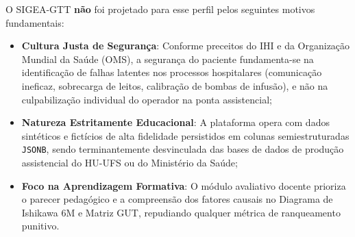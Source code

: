 O SIGEA-GTT \textbf{não} foi projetado para esse perfil pelos seguintes motivos fundamentais:
\begin{itemize}
    \item \textbf{Cultura Justa de Segurança}: Conforme preceitos do IHI e da Organização Mundial da Saúde (OMS), a segurança do paciente fundamenta-se na identificação de falhas latentes nos processos hospitalares (comunicação ineficaz, sobrecarga de leitos, calibração de bombas de infusão), e não na culpabilização individual do operador na ponta assistencial;
    \item \textbf{Natureza Estritamente Educacional}: A plataforma opera com dados sintéticos e fictícios de alta fidelidade persistidos em colunas semiestruturadas \texttt{JSONB}, sendo terminantemente desvinculada das bases de dados de produção assistencial do HU-UFS ou do Ministério da Saúde;
    \item \textbf{Foco na Aprendizagem Formativa}: O módulo avaliativo docente prioriza o parecer pedagógico e a compreensão dos fatores causais no Diagrama de Ishikawa 6M e Matriz GUT, repudiando qualquer métrica de ranqueamento punitivo.
\end{itemize}
